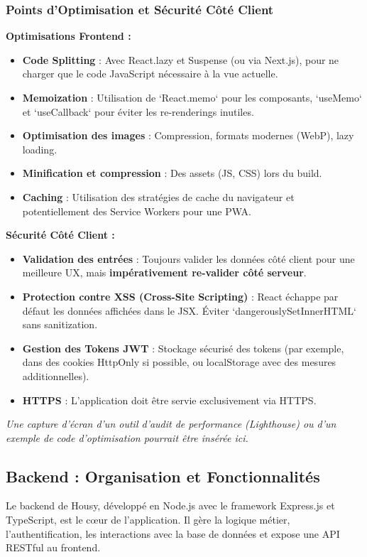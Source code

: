 \documentclass[11pt,a4paper]{report}
\begin{document}
\subsubsection{Points d’Optimisation et Sécurité Côté Client}
\textbf{Optimisations Frontend :}
\begin{itemize}[label=\textcolor{HousyGreen}{\textbullet}]
    \item \textbf{Code Splitting} : Avec React.lazy et Suspense (ou via Next.js), pour ne charger que le code JavaScript nécessaire à la vue actuelle.
    \item \textbf{Memoization} : Utilisation de `React.memo` pour les composants, `useMemo` et `useCallback` pour éviter les re-renderings inutiles.
    \item \textbf{Optimisation des images} : Compression, formats modernes (WebP), lazy loading.
    \item \textbf{Minification et compression} : Des assets (JS, CSS) lors du build.
    \item \textbf{Caching} : Utilisation des stratégies de cache du navigateur et potentiellement des Service Workers pour une PWA.
\end{itemize}

\textbf{Sécurité Côté Client :}
\begin{itemize}[label=\textcolor{HousyOrange}{\textbullet}]
    \item \textbf{Validation des entrées} : Toujours valider les données côté client pour une meilleure UX, mais \textbf{impérativement re-valider côté serveur}.
    \item \textbf{Protection contre XSS (Cross-Site Scripting)} : React échappe par défaut les données affichées dans le JSX. Éviter `dangerouslySetInnerHTML` sans sanitization.
    \item \textbf{Gestion des Tokens JWT} : Stockage sécurisé des tokens (par exemple, dans des cookies HttpOnly si possible, ou localStorage avec des mesures additionnelles).
    \item \textbf{HTTPS} : L'application doit être servie exclusivement via HTTPS.
\end{itemize}
\textit{Une capture d'écran d'un outil d'audit de performance (Lighthouse) ou d'un exemple de code d'optimisation pourrait être insérée ici.}

\subsection{Backend : Organisation et Fonctionnalités}
\label{ssec:backend}
Le backend de Housy, développé en Node.js avec le framework Express.js et TypeScript, est le cœur de l'application. Il gère la logique métier, l'authentification, les interactions avec la base de données et expose une API RESTful au frontend.
\end{document}
